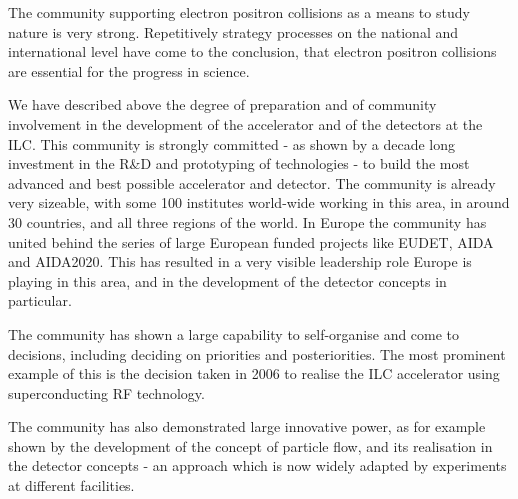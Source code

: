 \documentclass[%
 reprint,
 amsmath,amssymb,
 aps,
]{revtex4-1}
\begin{document}
The community supporting electron positron collisions as a means to study nature is very strong. Repetitively strategy processes on the national and international level have come to the conclusion, that electron positron collisions are essential for the progress in science. 

We have described above the degree of preparation and of community involvement in the development of the accelerator and of the detectors at the ILC. This community is strongly committed - as shown by a decade long investment in the R\&D and prototyping of technologies - to build the most advanced and best possible accelerator and detector. The community is already very sizeable, with some 100 institutes world-wide working in this area, in around 30 countries, and all three regions of the world. In Europe the community has united behind the series of large European funded projects like EUDET, AIDA and AIDA2020. This has resulted in a very visible leadership role Europe is playing in this area, and in the development of the detector concepts in particular. 

The community has shown a large capability to self-organise and come to decisions, including deciding on priorities and posteriorities. The most prominent example of this is the decision taken in 2006 to realise the ILC accelerator using superconducting RF technology. 

The community has also demonstrated large innovative power, as for example shown by the development of the concept of particle flow, and its realisation in the detector concepts - an approach which is now widely adapted by experiments at different facilities. 


\end{document}
